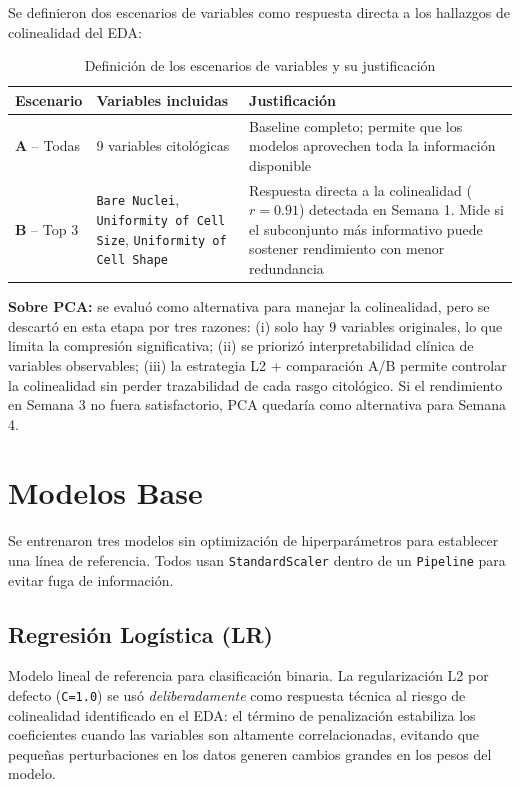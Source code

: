 \documentclass[11pt,a4paper]{article}
\begin{document}
Se definieron dos escenarios de variables como respuesta directa a los hallazgos de colinealidad del EDA:

\begin{table}[H]
\centering
\caption{Definición de los escenarios de variables y su justificación}
\renewcommand{\arraystretch}{1.2}
\begin{tabularx}{\textwidth}{l l X}
\toprule
\textbf{Escenario} & \textbf{Variables incluidas} & \textbf{Justificación} \\
\midrule
\textbf{A} -- Todas & 9 variables citológicas & Baseline completo; permite que los modelos aprovechen toda la información disponible \\
\midrule
\textbf{B} -- Top 3 & \texttt{Bare Nuclei}, \texttt{Uniformity of Cell Size}, \texttt{Uniformity of Cell Shape} & Respuesta directa a la colinealidad ($r=0.91$) detectada en Semana 1. Mide si el subconjunto más informativo puede sostener rendimiento con menor redundancia \\
\bottomrule
\end{tabularx}
\end{table}

\textbf{Sobre PCA:} se evaluó como alternativa para manejar la colinealidad, pero se descartó en esta etapa por tres razones: (i) solo hay 9 variables originales, lo que limita la compresión significativa; (ii) se priorizó interpretabilidad clínica de variables observables; (iii) la estrategia L2 + comparación A/B permite controlar la colinealidad sin perder trazabilidad de cada rasgo citológico. Si el rendimiento en Semana 3 no fuera satisfactorio, PCA quedaría como alternativa para Semana 4.

\section{Modelos Base}

Se entrenaron tres modelos sin optimización de hiperparámetros para establecer una línea de referencia. Todos usan \texttt{StandardScaler} dentro de un \texttt{Pipeline} para evitar fuga de información.

\subsection{Regresión Logística (LR)}

Modelo lineal de referencia para clasificación binaria. La regularización L2 por defecto (\texttt{C=1.0}) se usó \textit{deliberadamente} como respuesta técnica al riesgo de colinealidad identificado en el EDA: el término de penalización estabiliza los coeficientes cuando las variables son altamente correlacionadas, evitando que pequeñas perturbaciones en los datos generen cambios grandes en los pesos del modelo.
\end{document}
